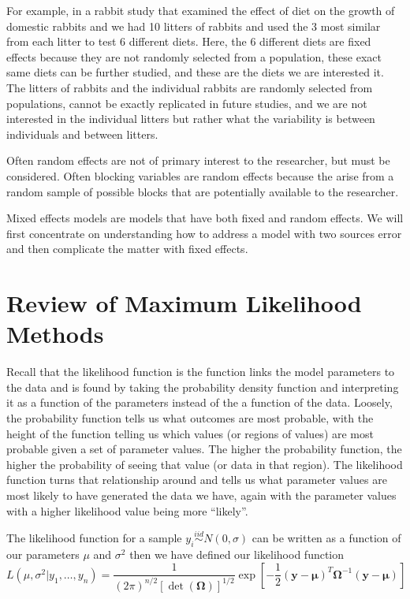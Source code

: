 \documentclass[]{book}
\theoremstyle{definition}
\theoremstyle{definition}
\theoremstyle{remark}
\begin{document}
For example, in a rabbit study that examined the effect of diet on the
growth of domestic rabbits and we had 10 litters of rabbits and used the
3 most similar from each litter to test 6 different diets. Here, the 6
different diets are fixed effects because they are not randomly selected
from a population, these exact same diets can be further studied, and
these are the diets we are interested it. The litters of rabbits and the
individual rabbits are randomly selected from populations, cannot be
exactly replicated in future studies, and we are not interested in the
individual litters but rather what the variability is between
individuals and between litters.

Often random effects are not of primary interest to the researcher, but
must be considered. Often blocking variables are random effects because
the arise from a random sample of possible blocks that are potentially
available to the researcher.

Mixed effects models are models that have both fixed and random effects.
We will first concentrate on understanding how to address a model with
two sources error and then complicate the matter with fixed effects.

\section{Review of Maximum Likelihood
Methods}\label{review-of-maximum-likelihood-methods}

Recall that the likelihood function is the function links the model
parameters to the data and is found by taking the probability density
function and interpreting it as a function of the parameters instead of
the a function of the data. Loosely, the probability function tells us
what outcomes are most probable, with the height of the function telling
us which values (or regions of values) are most probable given a set of
parameter values. The higher the probability function, the higher the
probability of seeing that value (or data in that region). The
likelihood function turns that relationship around and tells us what
parameter values are most likely to have generated the data we have,
again with the parameter values with a higher likelihood value being
more ``likely''.

The likelihood function for a sample
\(y_i \stackrel{iid}{\sim} N\left( 0, \sigma \right)\) can be written as
a function of our parameters \(\mu\) and \(\sigma^{2}\) then we have
defined our likelihood function
\[L \left(\mu,\sigma^{2}|y_{1},\dots,y_{n}\right)=\frac{1}{\left(2\pi\right)^{n/2}\left[\det\left(\boldsymbol{\Omega}\right)\right]^{1/2}}\exp\left[-\frac{1}{2}\left(\boldsymbol{y}-\boldsymbol{\mu}\right)^{T}\boldsymbol{\Omega}^{-1}\left(\boldsymbol{y}-\boldsymbol{\mu}\right)\right]\]
\end{document}

